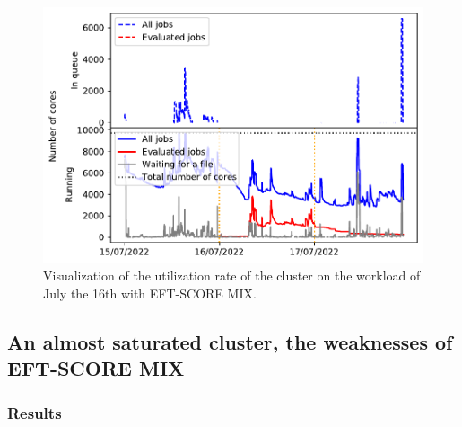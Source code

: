 \documentclass[conference,10pt]{IEEEtran}
\begin{document}
\begin{figure}[H]\centering\includegraphics[scale=0.47]{../MBSS/plot/Cluster_usage/2022-07-16->2022-07-16_V10000_Fcfs_with_a_score_mixed_strategy_x500_x1_x0_x0_Used_nodes_Reduced_450_128_32_256_4_1024_core_by_core.pdf}\caption{Visualization of the utilization rate of the cluster on the workload of July the 16th with EFT-SCORE MIX.}\end{figure}


\subsection{An almost saturated cluster, the weaknesses of EFT-SCORE MIX}

\subsubsection{Results}
\end{document}
